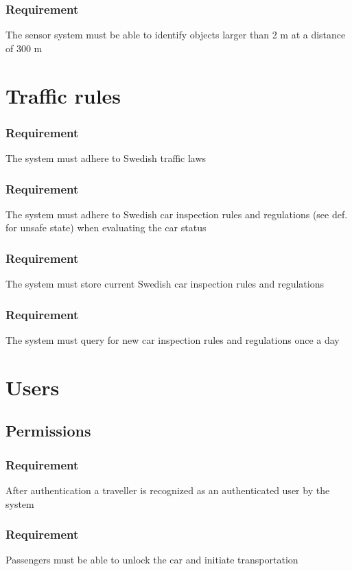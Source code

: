 \documentclass{article}
\begin{document}
{      \subsubsection{Requirement}
\hfill \break 
\- \- \-The sensor system must be able to identify objects larger than 2 m at a distance of 300 m

\section{Traffic rules}
    \setcounter{subsubsection}{0}
    \subsubsection{Requirement}
\hfill \break 
\- \- \-The system must adhere to Swedish traffic laws
    \subsubsection{Requirement}
\hfill \break 
\- \- \-The system must adhere to Swedish car inspection rules and regulations (see def. for unsafe state) when evaluating the car status
    \subsubsection{Requirement}
\hfill \break 
\- \- \-The system must store current Swedish car inspection rules and regulations
    \subsubsection{Requirement}
\hfill \break 
\- \- \-The system must query for new car inspection rules and regulations once a day

\section{Users}
  \subsection{Permissions}
      \subsubsection{Requirement}
\hfill \break 
\- \- \-After authentication a traveller is recognized as an authenticated user by the system
      \subsubsection{Requirement}
\hfill \break 
\- \- \-Passengers must be able to unlock the car and initiate transportation
}
\end{document}
